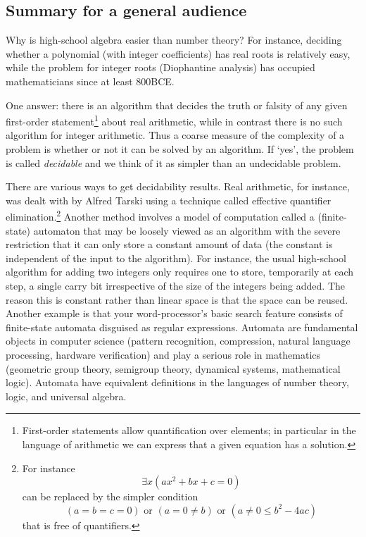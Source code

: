 \documentclass[12pt]{article}
\theoremstyle{plain} \numberwithin{equation}{section}
\theoremstyle{definition}
\def\tit#1{\subsection*{#1}}
\begin{document}
\thispagestyle{fancy}


\tit{Summary for a general audience}

Why is high-school algebra easier than number theory? For instance, deciding whether a polynomial (with integer coefficients) has real roots is relatively easy, while the problem for integer roots (Diophantine analysis) has occupied mathematicians since at least 800BCE.

One answer: there is an algorithm that decides the truth or falsity of any given first-order statement\footnote{First-order statements allow quantification over elements; in particular in the language of arithmetic we can express that a given equation has a solution.} about real arithmetic, while in contrast there is no such algorithm for integer arithmetic. Thus a coarse measure of the complexity of a problem is whether or not it can be solved by an algorithm. If `yes', the problem is called {\em decidable} and we think of it as simpler than an undecidable problem.

There are various ways to get decidability results. Real arithmetic, for instance, was dealt with by Alfred Tarski using a technique called effective quantifier elimination.\footnote{For instance
\[
\exists x (ax^2 + bx + c = 0)
\]
can be replaced by the simpler condition
\[
(a = b = c = 0) \textrm{ or } (a = 0 \neq b) \textrm{ or }  (a \neq 0 \leq b^2 - 4ac)
\]
that is free of quantifiers.} Another method involves a model of computation called a (finite-state) automaton that may be loosely viewed as an algorithm with the severe restriction that it can only store a constant amount of data (the constant is independent of the input to the algorithm). For instance, the usual high-school algorithm for adding two integers only requires one to store, temporarily at each step, a single carry bit irrespective of the size of the integers being added. The reason this is constant rather than linear space is that the space can be reused. 
Another example is that your word-processor's basic search feature consists of finite-state automata disguised as regular expressions. Automata are fundamental objects in computer science (pattern recognition, compression, natural language processing, hardware verification) and play a serious role in mathematics (geometric group theory, semigroup theory, dynamical systems, mathematical logic). Automata have equivalent definitions in the languages of number theory, logic, and universal algebra.
\end{document}
